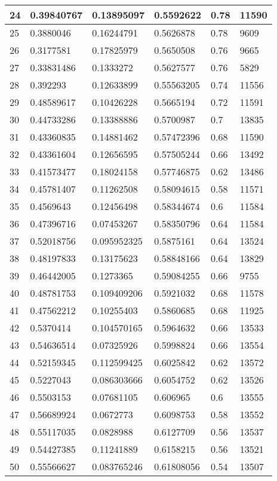 \begin{longtable}{|l|l|l|l|l|l|}
24 & 0.39840767 & 0.13895097 & 0.5592622 & 0.78 & 11590 \\ \hline 
25 & 0.3880046 & 0.16244791 & 0.5626878 & 0.78 & 9609 \\ \hline 
26 & 0.3177581 & 0.17825979 & 0.5650508 & 0.76 & 9665 \\ \hline 
27 & 0.33831486 & 0.1333272 & 0.5627577 & 0.76 & 5829 \\ \hline 
28 & 0.392293 & 0.12633899 & 0.55563205 & 0.74 & 11556 \\ \hline 
29 & 0.48589617 & 0.10426228 & 0.5665194 & 0.72 & 11591 \\ \hline 
30 & 0.44733286 & 0.13388886 & 0.5700987 & 0.7 & 13835 \\ \hline 
31 & 0.43360835 & 0.14881462 & 0.57472396 & 0.68 & 11590 \\ \hline 
32 & 0.43361604 & 0.12656595 & 0.57505244 & 0.66 & 13492 \\ \hline 
33 & 0.41573477 & 0.18024158 & 0.57746875 & 0.62 & 13486 \\ \hline 
34 & 0.45781407 & 0.11262508 & 0.58094615 & 0.58 & 11571 \\ \hline 
35 & 0.4569643 & 0.12456498 & 0.58344674 & 0.6 & 11584 \\ \hline 
36 & 0.47396716 & 0.07453267 & 0.58350796 & 0.64 & 11584 \\ \hline 
37 & 0.52018756 & 0.095952325 & 0.5875161 & 0.64 & 13524 \\ \hline 
38 & 0.48197833 & 0.13175623 & 0.58848166 & 0.64 & 13829 \\ \hline 
39 & 0.46442005 & 0.1273365 & 0.59084255 & 0.66 & 9755 \\ \hline 
40 & 0.48781753 & 0.109409206 & 0.5921032 & 0.68 & 11578 \\ \hline 
41 & 0.47562212 & 0.10255403 & 0.5860685 & 0.68 & 11925 \\ \hline 
42 & 0.5370414 & 0.104570165 & 0.5964632 & 0.66 & 13533 \\ \hline 
43 & 0.54636514 & 0.07325926 & 0.5998824 & 0.66 & 13554 \\ \hline 
44 & 0.52159345 & 0.112599425 & 0.6025842 & 0.62 & 13572 \\ \hline 
45 & 0.5227043 & 0.086303666 & 0.6054752 & 0.62 & 13526 \\ \hline 
46 & 0.5503153 & 0.07681105 & 0.606965 & 0.6 & 13555 \\ \hline 
47 & 0.56689924 & 0.0672773 & 0.6098753 & 0.58 & 13552 \\ \hline 
48 & 0.55117035 & 0.0828988 & 0.6127709 & 0.56 & 13537 \\ \hline 
49 & 0.54427385 & 0.11241889 & 0.6158215 & 0.56 & 13521 \\ \hline 
50 & 0.55566627 & 0.083765246 & 0.61808056 & 0.54 & 13507 \\ \hline 
\end{longtable}